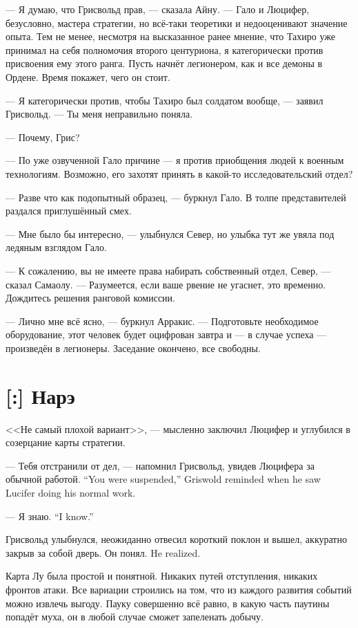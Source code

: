 --- Я думаю, что Грисвольд прав, --- сказала Айну.
--- Гало и Люцифер, безусловно, мастера стратегии, но всё-таки теоретики и недооценивают значение опыта.
Тем не менее, несмотря на высказанное ранее мнение, что Тахиро уже принимал на себя полномочия второго центуриона, я категорически против присвоения ему этого ранга.
Пусть начнёт легионером, как и все демоны в Ордене.
Время покажет, чего он стоит.

--- Я категорически против, чтобы Тахиро был солдатом вообще, --- заявил Грисвольд.
--- Ты меня неправильно поняла.

--- Почему, Грис?

--- По уже озвученной Гало причине --- я против приобщения людей к военным технологиям.
Возможно, его захотят принять в какой-то исследовательский отдел?

--- Разве что как подопытный образец, --- буркнул Гало.
В толпе представителей раздался приглушённый смех.

--- Мне было бы интересно, --- улыбнулся Север, но улыбка тут же увяла под ледяным взглядом Гало.

--- К сожалению, вы не имеете права набирать собственный отдел, Север, --- сказал Самаолу.
--- Разумеется, если ваше рвение не угаснет, это временно.
Дождитесь решения ранговой комиссии.

--- Лично мне всё ясно, --- буркнул Арракис.
--- Подготовьте необходимое оборудование, этот человек будет оцифрован завтра и --- в случае успеха --- произведён в легионеры.
Заседание окончено, все свободны.

\section{[:] Нарэ}

<<Не самый плохой вариант>>, --- мысленно заключил Люцифер и углубился в созерцание карты стратегии.

{--- Тебя отстранили от дел, --- напомнил Грисвольд, увидев Люцифера за обычной работой.}
{``You were suspended,'' Griswold reminded when he saw Lucifer doing his normal work.}

{--- Я знаю.}
{``I know.''}

Грисвольд улыбнулся, неожиданно отвесил короткий поклон и вышел, аккуратно закрыв за собой дверь.
{Он понял.}
{He realized.}

Карта Лу была простой и понятной.
Никаких путей отступления, никаких фронтов атаки.
Все вариации строились на том, что из каждого развития событий можно извлечь выгоду.
Пауку совершенно всё равно, в какую часть паутины попадёт муха, он в любой случае сможет запеленать добычу.

